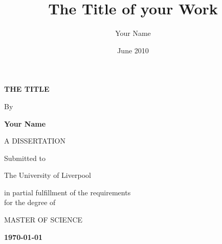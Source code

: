 
\title{The Title of your Work}
\author{Your Name}
\date{June 2010}

\begin{titlepage}

\begin{center}


\LARGE \textbf{THE TITLE
}
\vspace{12mm}

\Large By
\vspace{5mm}

\LARGE \textbf{Your Name
}
\vspace{20mm}


\LARGE A DISSERTATION
\vspace{10mm}

\Large Submitted to
\vspace{4mm}

\LARGE The University of Liverpool
\vspace{12mm}

\Large in partial fulfillment of the requirements\\
for the degree of
\vspace{5mm}

\Large MASTER OF SCIENCE
\vspace{45mm}


\LARGE \textbf{\ddmmyyyydate \today
}
\end{center}


\end{titlepage}
